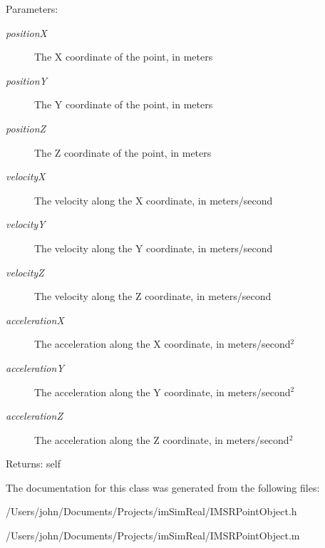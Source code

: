 \begin{Desc}
\item[Parameters:]
\begin{description}
\item[{\em positionX}]The X coordinate of the point, in meters \item[{\em positionY}]The Y coordinate of the point, in meters \item[{\em positionZ}]The Z coordinate of the point, in meters \item[{\em velocityX}]The velocity along the X coordinate, in meters/second \item[{\em velocityY}]The velocity along the Y coordinate, in meters/second \item[{\em velocityZ}]The velocity along the Z coordinate, in meters/second \item[{\em accelerationX}]The acceleration along the X coordinate, in meters/second$^{\mbox{2}}$  \item[{\em accelerationY}]The acceleration along the Y coordinate, in meters/second$^{\mbox{2}}$  \item[{\em accelerationZ}]The acceleration along the Z coordinate, in meters/second$^{\mbox{2}}$ \end{description}
\end{Desc}
\begin{Desc}
\item[Returns:]self \end{Desc}


The documentation for this class was generated from the following files:\begin{CompactItemize}
\item 
/Users/john/Documents/Projects/imSimReal/IMSRPointObject.h\item 
/Users/john/Documents/Projects/imSimReal/IMSRPointObject.m\end{CompactItemize}
